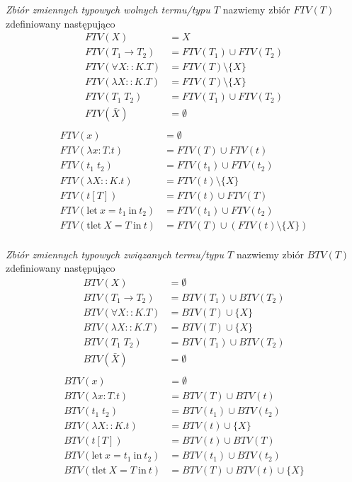 \documentclass[11pt,leqno]{article}
\begin{document}
\begin{definicja}
\emph{Zbiór zmiennych typowych wolnych termu/typu $T$} nazwiemy zbiór $FTV(T)$ zdefiniowany następująco
\begin{align*}
FTV(X) & = X \\
FTV(T_1 \to T_2) & = FTV(T_1) \cup FTV(T_2) \\
FTV(\forall X :: K . T) & = FTV(T) \setminus \{ X \} \\
FTV(\lambda X :: K . T) & = FTV(T) \setminus \{ X \} \\
FTV(T_1 \; T_2) & = FTV(T_1) \cup FTV(T_2) \\
FTV(\bar{X}) & = \emptyset \\
\end{align*}
\begin{align*}
FTV(x) & = \emptyset \\
FTV(\lambda x : T.t) & = FTV(T) \cup FTV(t) \\
FTV(t_1 \; t_2) & = FTV(t_1) \cup FTV(t_2) \\
FTV(\lambda X :: K.t) & = FTV(t) \setminus \{ X \} \\
FTV(t[T]) & = FTV(t) \cup FTV(T) \\
FTV(\textrm{let} \ x = t_1 \ \textrm{in} \ t_2) & = FTV(t_1) \cup FTV(t_2) \\
FTV(\textrm{tlet} \ X = T \ \textrm{in} \ t) & = FTV(T) \cup (FTV(t) \setminus \{ X \}) \\
\end{align*}
\end{definicja}

\begin{definicja}
\emph{Zbiór zmiennych typowych związanych termu/typu $T$} nazwiemy zbiór $BTV(T)$ zdefiniowany następująco
\begin{align*}
BTV(X) & = \emptyset \\
BTV(T_1 \to T_2) & = BTV(T_1) \cup BTV(T_2) \\
BTV(\forall X :: K . T) & = BTV(T) \cup \{ X \} \\
BTV(\lambda X :: K . T) & = BTV(T) \cup \{ X \} \\
BTV(T_1 \; T_2) & = BTV(T_1) \cup BTV(T_2) \\
BTV(\bar{X}) & = \emptyset \\
\end{align*}
\begin{align*}
BTV(x) & = \emptyset \\
BTV(\lambda x : T.t) & = BTV(T) \cup BTV(t) \\
BTV(t_1 \; t_2) & = BTV(t_1) \cup BTV(t_2) \\
BTV(\lambda X :: K.t) & = BTV(t) \cup \{ X \} \\
BTV(t[T]) & = BTV(t) \cup BTV(T) \\
BTV(\textrm{let} \ x = t_1 \ \textrm{in} \ t_2) & = BTV(t_1) \cup BTV(t_2) \\
BTV(\textrm{tlet} \ X = T \ \textrm{in} \ t) & = BTV(T) \cup BTV(t) \cup \{ X \} \\
\end{align*}
\end{definicja}
\end{document}
